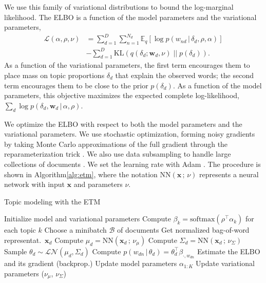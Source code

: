 \documentclass[11pt,a4paper]{article}
\DeclareRobustCommand{\E}[2]{\mathbb{E}_{#1}\left[#2\right]}
\newcommand{\g}{\, | \,}
\newcommand{\prm}{\, ; \,}
\newcommand{\Lcal}{\mathcal{L}}
\newcommand{\Ncal}{\mathcal{N}}
\newcommand{\bx}{\mathbf{x}}
\newcommand{\bw}{\mathbf{w}}
\newcommand{\cL}{\mathcal{L}}
\begin{document}
We use this family of variational distributions to bound the log-marginal
likelihood.  The \gls{ELBO} is a function of the model
parameters and the variational parameters,
\begin{align}
  \label{eq:elbo}
  \cL (\alpha, \rho, \nu) & =
        \sum_{d=1}^{D}
        \sum_{n=1}^{N_d}
        \E{q}{\log p(w_{nd} \g \delta_d, \rho, \alpha)} \nonumber\\
       & - \sum_{d=1}^{D}
        \mathrm{KL}(q(\delta_d ; \bw_d, \nu) \; || \; p(\delta_d)).
\end{align}
As a function of the variational parameters, the first term encourages
them to place mass on topic proportions $\delta_d$ that explain the
observed words; the second term encourages them to be close to the
prior $p(\delta_d)$.  As a function of the model parameters, this
objective maximizes the expected complete log-likelihood,
$\sum_{d} \log p(\delta_d, \bw_d \g \alpha, \rho)$.

We optimize the \gls{ELBO} with respect to both the model parameters
and the variational parameters. We use stochastic optimization,
forming noisy gradients by taking Monte Carlo approximations of the
full gradient through the reparameterization trick
\citep{kingma2014autoencoding,Titsias2014_doubly,rezende2014stochastic}.
We also use data subsampling to handle large collections of documents
\citep{Hoffman2013}.  We set the learning rate with Adam \citep{Kingma2015}.
The procedure is shown in Algorithm\nobreakspace \ref {alg:etm}, where the notation
$\textrm{NN}(\mathbf{x}\prm \nu)$ represents a neural network with input
$\mathbf{x}$ and parameters $\nu$.


\begin{algorithm}[t]
  \caption{Topic modeling with the \gls{ETM}}
  \label{alg:etm}
  \small
  \begin{algorithmic}
    \STATE Initialize model and variational parameters
    \STATE Compute $\beta_k = \text{softmax}(\rho^\top \alpha_k)$ for each topic $k$
    \STATE Choose a minibatch $\mathcal{B}$ of documents
    \STATE Get normalized bag-of-word representat.\ $\bx_d$
    \STATE Compute $\mu_d = \textrm{NN}(\bx_d\prm \nu_{\mu})$
    \STATE Compute $\Sigma_d = \textrm{NN}(\bx_d\prm \nu_{\Sigma})$
                \STATE Sample $\theta_d \sim \Lcal\Ncal(\mu_d, \Sigma_d)$
    \STATE Compute $p(w_{dn} \g \theta_d) = \theta_d^\top\beta_{\cdot,w_{dn}}$
    \ENDFOR
    \ENDFOR
    \STATE Estimate the \acrshort{ELBO} and its gradient (backprop.)
    \STATE Update model parameters $\alpha_{1:K}$
    \STATE Update variational parameters ($\nu_\mu$, $\nu_\Sigma$)
    \ENDFOR
  \end{algorithmic}
\end{algorithm}
\end{document}
